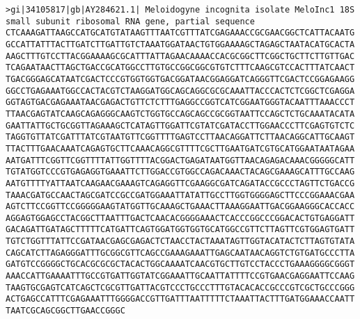 \documentclass[11pt]{article}
\begin{document}
\begin{Verbatim}[commandchars=\\\{\}]
>gi|34105817|gb|AY284621.1| Meloidogyne incognita isolate MeloInc1 18S small subunit ribosomal RNA gene, partial sequence
CTCAAAGATTAAGCCATGCATGTATAAGTTTAATCGTTTATCGAGAAACCGCGAACGGCTCATTACAATG
GCCATTATTTACTTGATCTTGATTGTCTAAATGGATAACTGTGGAAAAGCTAGAGCTAATACATGCACTA
AAGCTTTGTCCTTACGGAAAAGCGCATTTATTAGAACAAAACCACGCGGCTTCGGCTGCTTCTTGTTGAC
TCAGAATAACTTAGCTGACCGCATGGCCTTGTGCCGGCGGCGTGTCTTTCAAGCGTCCACTTTATCAACT
TGACGGGAGCATAATCGACTCCCGTGGTGGTGACGGATAACGGAGGATCAGGGTTCGACTCCGGAGAAGG
GGCCTGAGAAATGGCCACTACGTCTAAGGATGGCAGCAGGCGCGCAAATTACCCACTCTCGGCTCGAGGA
GGTAGTGACGAGAAATAACGAGACTGTTCTCTTTGAGGCCGGTCATCGGAATGGGTACAATTTAAACCCT
TTAACGAGTATCAAGCAGAGGGCAAGTCTGGTGCCAGCAGCCGCGGTAATTCCAGCTCTGCAAATACATA
GAATTATTGCTGCGGTTAGAAAGCTCATAGTTGGATTCGTATCGATACCTTGGAACCCTTCGAGTGTCTC
TAGGTGTTATCGATTTATCGTAATGTTCGGTTTTGAGTCCTTAACAGGATTCTTAACAGGCATTGCAAGT
TTACTTTGAACAAATCAGAGTGCTTCAAACAGGCGTTTTCGCTTGAATGATCGTGCATGGAATAATAGAA
AATGATTTCGGTTCGGTTTTATTGGTTTTACGGACTGAGATAATGGTTAACAGAGACAAACGGGGGCATT
TGTATGGTCCCGTGAGAGGTGAAATTCTTGGACCGTGGCCAGACAAACTACAGCGAAAGCATTTGCCAAG
AATGTTTTYATTAATCAAGAACGAAAGTCAGAGGTTCGAAGGCGATCAGATACCGCCCTAGTTCTGACCG
TAAACGATGCCAACTAGCGATCCGCCGATGGAAATTATATTGCCTTGGTGGGGAGCTTCCCGGAAACGAA
AGTCTTCCGGTTCCGGGGGAAGTATGGTTGCAAAGCTGAAACTTAAAGGAATTGACGGAAGGGCACCACC
AGGAGTGGAGCCTACGGCTTAATTTGACTCAACACGGGGAAACTCACCCGGCCCGGACACTGTGAGGATT
GACAGATTGATAGCTTTTTCATGATTCAGTGGATGGTGGTGCATGGCCGTTCTTAGTTCGTGGAGTGATT
TGTCTGGTTTATTCCGATAACGAGCGAGACTCTAACCTACTAAATAGTTGGTACATACTCTTAGTGTATA
CAGCATCTTAGAGGGATTTGCGGCGTTCAGCCGAAAGAAATTGAGCAATAACAGGTCTGTGATGCCCTTA
GATGTCCGGGGCTGCACGCGCGCTACACTGGCAAAATCAACGTGCTTGTCCTACCCTGAAAGGGGCGGGT
AAACCATTGAAAATTTGCCGTGATTGGTATCGGAAATTGCAATTATTTTCCGTGAACGAGGAATTCCAAG
TAAGTGCGAGTCATCAGCTCGCGTTGATTACGTCCCTGCCCTTTGTACACACCGCCCGTCGCTGCCCGGG
ACTGAGCCATTTCGAGAAATTTGGGGACCGTTGATTTAATTTTTCTAAATTACTTTGATGGAAACCAATT
TAATCGCAGCGGCTTGAACCGGGC


\end{Verbatim}
\end{document}
